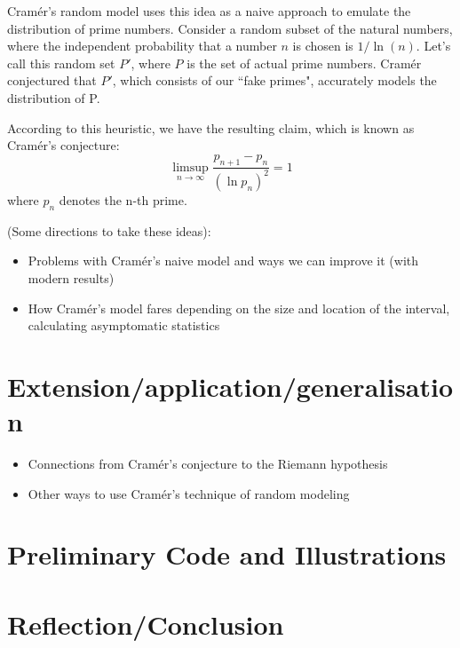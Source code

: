 \documentclass{article}
\begin{document}
Cram\'er's random model uses this idea as a naive approach to emulate the distribution of prime numbers. Consider a random subset of the natural numbers, where the independent probability that a number $n$ is chosen is $1 / \ln(n)$. Let's call this random set $P'$, where $P$ is the set of actual prime numbers. Cram\'er conjectured that $P'$, which consists of our ``fake primes", accurately models the distribution of P. 

According to this heuristic, we have the resulting claim, which is known as Cram\'er's conjecture:
\[\limsup_{n \to \infty} \frac{p_{n + 1} - p_n}{(\ln p_n)^2} = 1\]
where $p_n$ denotes the n-th prime.

(Some directions to take these ideas):
\begin{itemize}
  \item Problems with Cram\'er's naive model and ways we can improve it (with modern results)
  \item How Cram\'er's model fares depending on the size and location of the interval, calculating asymptomatic statistics
\end{itemize}
\section{Extension/application/generalisation}
\begin{itemize}
    \item Connections from Cram\'er's conjecture to the Riemann hypothesis
    \item Other ways to use Cram\'er's technique of random modeling
\end{itemize}


\section{Preliminary Code and Illustrations}


\section{Reflection/Conclusion}
\end{document}
